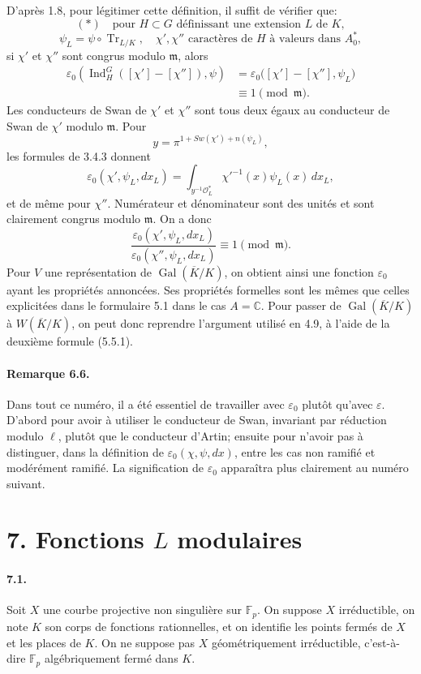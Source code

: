 \documentclass[10pt]{article}
\newcommand{\C}{\mathbb C}
\newcommand{\F}{\mathbb F}
\newcommand{\Gal}{\operatorname{Gal}}
\newcommand{\Ind}{\operatorname{Ind}}
\newcommand{\Tr}{\operatorname{Tr}}
\providecommand{\Gal}{\operatorname{Gal}}
\providecommand{\Gal}{\operatorname{Gal}}
\providecommand{\Tr}{\operatorname{Tr}}
\providecommand{\Gal}{\operatorname{Gal}}
\providecommand{\Tr}{\operatorname{Tr}}
\providecommand{\Gal}{\operatorname{Gal}}
\providecommand{\Tr}{\operatorname{Tr}}
\providecommand{\Ind}{\operatorname{Ind}}
\begin{document}
D'après 1.8, pour légitimer cette définition, il suffit de vérifier que:
\[
(*)\quad
\text{pour }H\subset G\text{ définissant une extension }L\text{ de }K,
\]
\[
\psi_L=\psi\circ\Tr_{L/K},\quad
\chi',\chi''\text{ caractères de }H\text{ à valeurs dans }A_0^*,
\]
si \(\chi'\) et \(\chi''\) sont congrus modulo \(\mathfrak m\), alors
\[
\begin{aligned}
\varepsilon_0\!\left(\Ind_H^G([\chi']-[\chi'']),\psi\right)
&=\varepsilon_0\bigl([\chi']-[\chi''],\psi_L\bigr)\\
&\equiv1\pmod{\mathfrak m}.
\end{aligned}
\]
Les conducteurs de Swan de \(\chi'\) et \(\chi''\) sont tous deux égaux au conducteur de Swan de \(\chi'\) modulo \(\mathfrak m\). Pour
\[
y=\pi^{1+Sw(\chi')+n(\psi_L)},
\]
les formules de 3.4.3 donnent
\[
\varepsilon_0(\chi',\psi_L,dx_L)=
\int_{y^{-1}\mathcal O_L^*}\chi'^{-1}(x)\psi_L(x)\,dx_L,
\]
et de même pour \(\chi''\). Numérateur et dénominateur sont des unités et sont clairement congrus modulo \(\mathfrak m\). On a donc
\[
\frac{\varepsilon_0(\chi',\psi_L,dx_L)}
{\varepsilon_0(\chi'',\psi_L,dx_L)}
\equiv1\pmod{\mathfrak m}.
\]
Pour \(V\) une représentation de \(\Gal(\overline K/K)\), on obtient ainsi une fonction \(\varepsilon_0\) ayant les propriétés annoncées. Ses propriétés formelles sont les mêmes que celles explicitées dans le formulaire 5.1 dans le cas \(A=\C\). Pour passer de \(\Gal(\overline K/K)\) à \(W(\overline K/K)\), on peut donc reprendre l'argument utilisé en 4.9, à l'aide de la deuxième formule (5.5.1).

\paragraph{Remarque 6.6.} Dans tout ce numéro, il a été essentiel de travailler avec \(\varepsilon_0\) plutôt qu'avec \(\varepsilon\). D'abord pour avoir à utiliser le conducteur de Swan, invariant par réduction modulo \(\ell\), plutôt que le conducteur d'Artin; ensuite pour n'avoir pas à distinguer, dans la définition de \(\varepsilon_0(\chi,\psi,dx)\), entre les cas non ramifié et modérément ramifié. La signification de \(\varepsilon_0\) apparaîtra plus clairement au numéro suivant.

\section*{7. Fonctions \(L\) modulaires}

\paragraph{7.1.} Soit \(X\) une courbe projective non singulière sur \(\F_p\). On suppose \(X\) irréductible, on note \(K\) son corps de fonctions rationnelles, et on identifie les points fermés de \(X\) et les places de \(K\). On ne suppose pas \(X\) géométriquement irréductible, c'est-à-dire \(\F_p\) algébriquement fermé dans \(K\).
\end{document}
